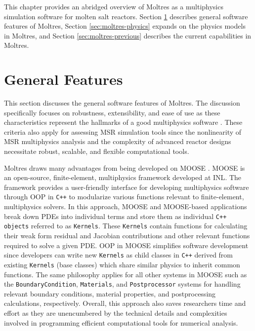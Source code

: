 This chapter provides an abridged overview of Moltres as a multiphysics
simulation software for molten salt reactors. 
Section \ref{sec:moltres-features}
describes general software features of Moltres, Section
\ref{sec:moltres-physics} expands on the physics models in Moltres, and Section
\ref{sec:moltres-previous} describes the current capabilities in Moltres.

\section{General Features} \label{sec:moltres-features}

This section discusses the general software features of Moltres. The
discussion specifically focuses on robustness, extensibility, and ease of use
as these characteristics represent the hallmarks of a good multiphysics
software \cite{keyes_multiphysics_2013}. These criteria also apply for
assessing \gls{MSR} simulation tools since the nonlinearity of \gls{MSR}
multiphysics analysis and the complexity of advanced reactor designs
necessitate robust, scalable, and flexible computational tools.

Moltres draws many advantages from being developed on MOOSE
\cite{permann_moose_2020}. MOOSE is an open-source, finite-element,
multiphysics framework developed at \gls{INL}. The framework provides a
user-friendly interface for developing multiphysics software through
\gls{OOP} in \texttt{C++} to modularize various
functions relevant to finite-element, multiphysics solvers. In this approach,
MOOSE and MOOSE-based applications break down \glspl{PDE} into individual terms
and store them as individual \texttt{C++ objects} referred to as
\texttt{Kernels}. These \texttt{Kernels} contain functions for calculating
their weak form residual and Jacobian
contributions and other relevant functions required to solve a given
\gls{PDE}. \gls{OOP} in MOOSE simplifies software development
since developers can write new \texttt{Kernels} as child classes in
\texttt{C++} derived from existing \texttt{Kernels} (base classes) which share
similar physics to inherit common functions.
The same philosophy applies for all other systems in MOOSE such as
the \texttt{BoundaryCondition}, \texttt{Materials}, and \texttt{Postprocessor}
systems for handling relevant boundary conditions, material properties, and
postprocessing calculations, respectively. Overall, this approach also saves
researchers time and effort as they are unencumbered by the technical details
and complexities involved in programming efficient computational tools for
numerical analysis.

